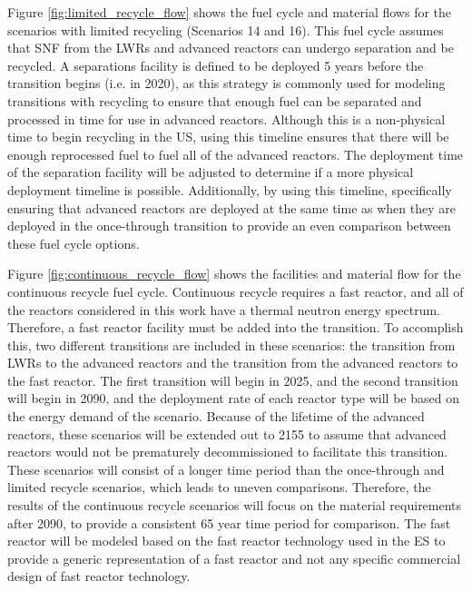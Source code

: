 Figure \ref{fig:limited_recycle_flow} shows the fuel cycle and material flows 
for the scenarios with limited recycling (Scenarios 14 and 16). This fuel 
cycle assumes that \gls{SNF}
from the \glspl{LWR} and advanced reactors can undergo separation and be 
recycled. A separations facility is defined to be deployed 5 years before 
the transition 
begins (i.e. in 2020), as this strategy is commonly used for modeling 
transitions with recycling \cite{passerini_systematic_2014,richards_application_2021}
to ensure that enough fuel can be separated and 
processed in time for use in advanced reactors. Although this is a 
non-physical time to begin recycling in the US, using this timeline ensures 
that there will be enough reprocessed fuel to fuel all of the advanced 
reactors. The deployment time of the separation facility will be adjusted 
to determine if a more physical deployment timeline is possible. Additionally, 
by using this timeline, specifically ensuring that advanced reactors 
are deployed at the same time as when they are deployed in the once-through 
transition to provide an even comparison between these fuel cycle options. 



Figure \ref{fig:continuous_recycle_flow} shows the facilities and material 
flow for the continuous recycle fuel cycle. Continuous recycle 
requires a fast reactor, and all of the reactors considered in this 
work have a thermal neutron energy spectrum. Therefore, a fast reactor 
facility 
must be added into the transition. To accomplish this, two different 
transitions are included in these scenarios: the transition from 
\glspl{LWR} to the advanced reactors and the transition from the 
advanced reactors to the fast reactor. The first transition will begin 
in 2025, and the second transition will begin in 2090, and the deployment 
rate of each reactor type will be based on the energy demand of the 
scenario. Because of the lifetime of the advanced reactors, these scenarios 
will be extended out to 2155 to assume that advanced reactors would not 
be prematurely decommissioned to facilitate this transition. These 
scenarios will consist of a longer time period than the once-through 
and limited recycle scenarios, which leads to uneven comparisons. Therefore, 
the results of the continuous recycle scenarios will focus on the 
material requirements after 2090, to provide a consistent 65 year 
time period for comparison. 
The fast reactor will be modeled 
based on the fast reactor technology used in the \gls{ES} 
\cite{wigeland_nuclear_2014} to provide a generic representation of 
a fast reactor and not any specific commercial design of fast reactor 
technology. 


